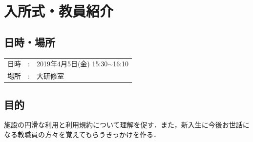 
%

\section{入所式・教員紹介}

\subsection{日時・場所}
\begin{tabular}{p{}rp{}}
  日時 & : & 2019年4月5日(金) 15:30$\sim$16:10\\
  場所 & : & 大研修室
\end{tabular}

\subsection{目的}
施設の円滑な利用と利用規約について理解を促す．また，新入生に今後お世話になる教職員の方々を覚えてもらうきっかけを作る．

